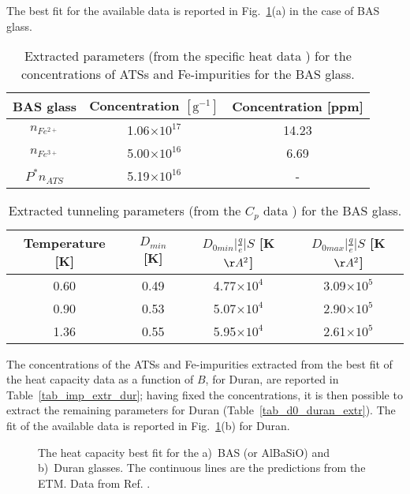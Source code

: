 \documentclass[10pt]{article}
\begin{document}
The best fit for the available data is reported in Fig.~\ref{heat_capa_fit}(a) in the
case of BAS glass.
\begin{table}[htbp]
\begin{center}
\begin{tabular}{|c|c|c|}
\hline
BAS glass & Concentration $\mathrm{[g^{-1}]}$ & Concentration [ppm] \\
\hline
\hline
\textbf{$n_{Fe^{2+}}$} & 1.06$\times10^{17}$ & 14.23 \\
\textbf{$n_{Fe^{3+}}$} & 5.00$\times10^{16}$ &  6.69\\
\textbf{$P^{\ast}n_{ATS}$} & 5.19$\times10^{16}$ & - \\
\hline
\end{tabular}
\caption{Extracted parameters (from the specific heat data \cite{Sie2001}) for the
concentrations of ATSs and Fe-impurities for the BAS glass.}
\label{tab_imp_extr}
\end{center}
\end{table}
\begin{table}[htbp]
\begin{center}
\begin{tabular}{|c|c|c|c|}
\hline
Temperature [K] & $D_{min}$ [K] & $D_{0min}\vert\frac{q}{e}\vert S$ [K$\AA^2$] & $D_{0max}\vert\frac{q}{e}\vert S$ [K$\AA^2$]\\
\hline
\hline
0.60 & 0.49 & 4.77$\times 10^{4}$ & 3.09$\times 10^{5}$ \\
0.90 & 0.53 & 5.07$\times 10^{4}$ & 2.90$\times 10^{5}$ \\
1.36 & 0.55 & 5.95$\times 10^{4}$ & 2.61$\times 10^{5}$ \\
\hline
\end{tabular}
\caption{Extracted tunneling parameters (from the $C_p$ data \cite{Sie2001}) for the 
BAS glass.}
\label{tab_d0_ALBASI_extr}
\end{center}
\end{table}
The concentrations of the ATSs and Fe-impurities extracted from the best fit of
the heat capacity data \cite{Sie2001} as a function of $B$, for Duran, are reported in
Table~\ref{tab_imp_extr_dur}; having fixed the concentrations, it is then possible
to extract the remaining parameters for Duran (Table~\ref{tab_d0_duran_extr}). The
fit of the available data \cite{Sie2001} is reported in Fig.~\ref{heat_capa_fit}(b) for 
Duran.
\begin{figure}[htbp]
\centering
\caption{ The heat capacity best fit for the a)~BAS (or AlBaSiO)
and b)~Duran glasses. The continuous lines are the predictions from the ETM. Data
from Ref. \cite{Sie2001}.}
\label{heat_capa_fit}
\end{figure}
\end{document}
